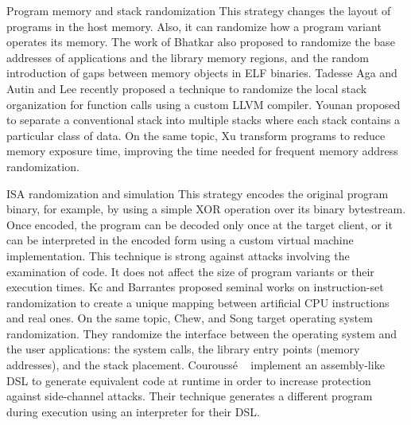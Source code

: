 \begin{strategy}{Program memory and stack randomization}
    \label{strategy:S7}
    \normalfont
    This strategy changes the layout of programs in the host memory. Also, it can randomize how a program variant operates its memory. The work of Bhatkar \etal \cite{bhatkar03, bhatkar2005efficient} also proposed to randomize the base addresses of applications and the library memory regions, and the random introduction of gaps between memory objects in ELF binaries. Tadesse Aga and Autin \cite{aga2019smokestack} and Lee \etal \cite{lee2021savior} recently proposed a technique to randomize the local stack organization for function calls using a custom LLVM compiler.
    Younan \etal \cite{Younan2006} proposed to separate a conventional stack into multiple stacks where each stack contains a particular class of
    data. 
    On the same topic, Xu \etal \cite{xu2020merr} transform programs to reduce memory exposure time, improving the time needed for frequent memory address randomization. 
\end{strategy}


\begin{strategy}{ISA randomization and simulation}
    \label{strategy:S8}
    \normalfont
    This strategy encodes the original program binary, for example, by using a simple XOR operation over its binary bytestream. Once encoded, the program can be decoded only once at the target client, or it can be interpreted in the encoded form using a custom virtual machine implementation. This technique is strong against attacks involving the examination of code. It does not affect the size of program variants or their execution times.
    Kc \etal and Barrantes \etal \cite{Kc03,barrantes2003randomized} proposed seminal works on instruction-set randomization 
    to create a unique mapping between artificial CPU instructions and real ones.
    On the same topic, Chew, and Song \cite{Chew02mitigatingbuffer} target operating system randomization. They randomize the interface between the operating system and the user applications: the system calls, the library entry points (memory addresses), and the stack placement. 
    Courouss{\'e} \etal~\cite{courousse2016runtime} implement an assembly-like DSL to generate equivalent code at runtime in order to increase protection against side-channel attacks. Their technique generates a different program during execution using an interpreter for their DSL.

    
\end{strategy}


